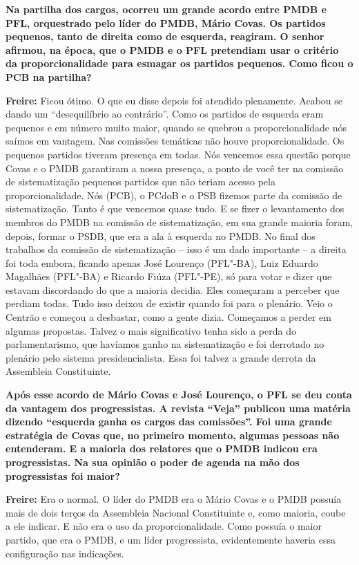 \textbf{Na partilha dos cargos, ocorreu um grande acordo entre PMDB e
PFL, orquestrado pelo líder do PMDB, Mário Covas. Os partidos pequenos,
tanto de direita como de esquerda, reagiram. O senhor afirmou, na época,
que o PMDB e o PFL pretendiam usar o critério da proporcionalidade para
esmagar os partidos pequenos. Como ficou o PCB na partilha?}

\textbf{Freire:} Ficou ótimo. O que eu disse depois foi atendido
plenamente. Acabou se dando um ``desequilíbrio ao contrário''. Como os
partidos de esquerda eram pequenos e em número muito maior, quando se
quebrou a proporcionalidade nós saímos em vantagem. Nas comissões
temáticas não houve proporcionalidade. Os pequenos partidos tiveram
presença em todas. Nós vencemos essa questão porque Covas e o PMDB
garantiram a nossa presença, a ponto de você ter na comissão de
sistematização pequenos partidos que não teriam acesso pela
proporcionalidade. Nós (PCB), o PCdoB e o PSB fizemos parte da comissão
de sistematização. Tanto é que vencemos quase tudo. E se fizer o
levantamento dos membros do PMDB na comissão de sistematização, em sua
grande maioria foram, depois, formar o PSDB, que era a ala à esquerda no
PMDB. No final dos trabalhos da comissão de sistematização -- isso é um
dado importante -- a direita foi toda embora, ficando apenas José
Lourenço (PFL"-BA), Luiz Eduardo Magalhães (PFL"-BA) e Ricardo Fiúza
(PFL"-PE), só para votar e dizer que estavam discordando do que a maioria
decidia. Eles começaram a perceber que perdiam todas. Tudo isso deixou
de existir quando foi para o plenário. Veio o Centrão e começou a
desbastar, como a gente dizia. Começamos a perder em algumas propostas.
Talvez o mais significativo tenha sido a perda do parlamentarismo, que
havíamos ganho na sistematização e foi derrotado no plenário pelo
sistema presidencialista. Essa foi talvez a grande derrota da Assembleia
Constituinte.

\textbf{Após esse acordo de Mário Covas e José Lourenço, o PFL se deu
conta da vantagem dos progressistas. A revista ``Veja'' publicou uma
matéria dizendo ``esquerda ganha os cargos das comissões''. Foi uma
grande estratégia de Covas que, no primeiro momento, algumas pessoas não
entenderam. E a maioria dos relatores que o PMDB indicou era
progressistas. Na sua opinião o poder de agenda na mão dos progressistas
foi maior?}

\textbf{Freire:} Era o normal. O líder do PMDB era o Mário Covas e o
PMDB possuía mais de dois terços da Assembleia Nacional Constituinte e,
como maioria, coube a ele indicar. E não era o uso da proporcionalidade.
Como possuía o maior partido, que era o PMDB, e um líder progressista,
evidentemente haveria essa configuração nas indicações.

